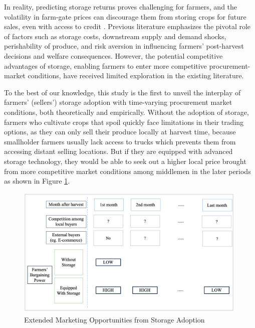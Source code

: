 \documentclass[12pt,authoryear, notitlepage]{elegantpaper}
\begin{document}
In reality, predicting storage returns proves challenging for farmers, and the volatility in farm-gate prices can discourage them from storing crops for future sales, even with access to credit \citep{cardell2023price}. Previous literature emphasizes the pivotal role of factors such as storage costs, downstream supply and demand shocks, perishability of produce, and risk aversion in influencing farmers' post-harvest decisions and welfare consequences. However, the potential competitive advantages of storage, enabling farmers to enter more competitive procurement-market conditions, have received limited exploration in the existing literature.

To the best of our knowledge, this study is the first to unveil the interplay of farmers' (sellers') storage adoption with time-varying procurement market conditions, both theoretically and empirically. Without the adoption of storage, farmers who cultivate crops that spoil quickly face limitations in their trading options, as they can only sell their produce locally at harvest time, because smallholder farmers usually lack access to trucks which prevents them from accessing distant selling locations. But if they are equipped with advanced storage technology, they would be able to seek out a higher local price brought from more competitive market conditions among middlemen in the later periods as shown in Figure \ref{Figure: Demo}.

\begin{figure}[ht]
\centering
\includegraphics[width=1\textwidth]{Figures/graphic_demo.png}
\caption{Extended Marketing Opportunities from Storage Adoption}
\label{Figure: Demo}
\end{figure}
\end{document}
